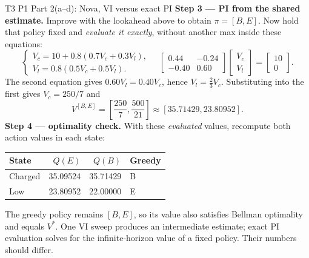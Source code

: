 \documentclass[10pt,a4paper]{article}
\begin{document}
\begin{question}{T3 P1 Part 2(a--d): Nova, VI versus exact PI}
\textbf{Step 3 --- PI from the shared estimate.} Improve with the lookahead above to obtain $\pi=[B,E]$. Now hold that policy fixed and \emph{evaluate it exactly}, without another max inside these equations:
\[
\begin{cases}
V_c=10+0.8(0.7V_c+0.3V_l),\\
V_l=0.8(0.5V_c+0.5V_l).
\end{cases}
\quad
\begin{bmatrix}0.44&-0.24\\-0.40&0.60\end{bmatrix}
\begin{bmatrix}V_c\\V_l\end{bmatrix}=
\begin{bmatrix}10\\0\end{bmatrix}.
\]
The second equation gives $0.60V_l=0.40V_c$, hence $V_l=\frac23V_c$. Substituting into the first gives $V_c=250/7$ and
\[
\boxed{V^{[B,E]}=\left[\frac{250}{7},\frac{500}{21}\right]
\approx[35.71429,23.80952].}
\]
\textbf{Step 4 --- optimality check.} With these \emph{evaluated} values, recompute both action values in each state:
\begin{center}
\begin{tabular}{@{}lrrl@{}}
\toprule State & $Q(E)$ & $Q(B)$ & Greedy \\\midrule
Charged & 35.09524 & 35.71429 & B \\
Low & 23.80952 & 22.00000 & E \\\bottomrule
\end{tabular}
\end{center}
The greedy policy remains $[B,E]$, so its value also satisfies Bellman optimality and equals $V^*$. One VI sweep produces an intermediate estimate; exact PI evaluation solves for the infinite-horizon value of a fixed policy. Their numbers should differ.
\end{question}
\end{document}
